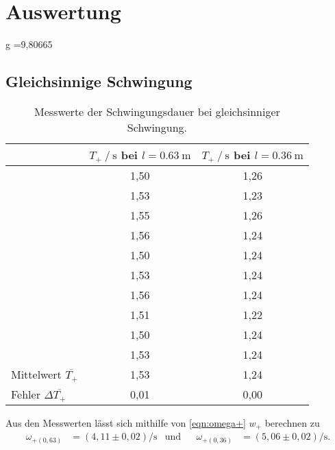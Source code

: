 \section{Auswertung}
\label{sec:Auswertung}

g =9,80665
\subsection{Gleichsinnige Schwingung}
\label{subsec:aus_gleich}

\begin{table}[H]
  \centering
  \caption{Messwerte der Schwingungsdauer bei gleichsinniger Schwingung.}
  \label{tab:T+}
  \begin{tabular}{l S S}
    \toprule
     & {$T_+ \mathbin{/} \si{\second}$ bei $l=\qty{0.63}{\meter}$} & {$T_+ \mathbin{/} \si{\second}$ bei $l=\qty{0.36}{\meter}$}\\
    \midrule
      &1,50 & 1,26\\
      &1,53 & 1,23\\
      &1,55 & 1,26\\
      &1,56 & 1,24\\
      &1,50 & 1,24\\
      &1,53 & 1,24\\
      &1,56 & 1,24\\
      &1,51 & 1,22\\
      &1,50 & 1,24\\
      &1,53 & 1,24\\
    \midrule
      Mittelwert $\overline{T_+}$& 1,53 & 1,24\\
      Fehler $\Delta \overline{T_+}$& 0,01 & 0,00\\
    \bottomrule
  \end{tabular}
\end{table}

Aus den Messwerten lässt sich mithilfe von \autoref{eqn:omega+} $w_+$ berechnen zu 
\begin{align*}
  \omega_{+(0,63)}&=(4,11 \pm 0,02) \si{\per\second} & \text{und} && \omega_{+(0,36)}&=(5,06 \pm 0,02) \si{\per\second}.
\end{align*}

